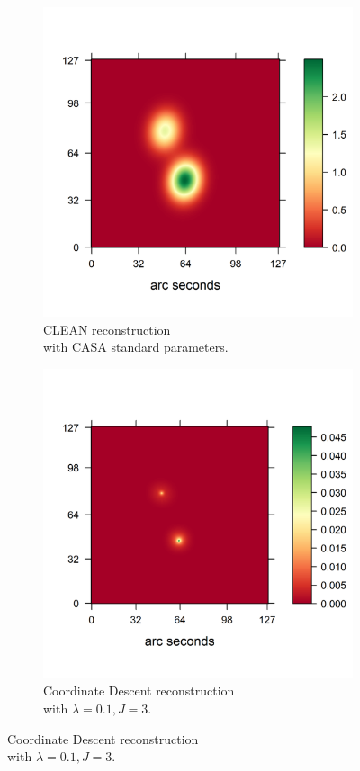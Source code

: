 \begin{figure}[h]
	\centering
	\begin{subfigure}[b]{0.4\linewidth}
		\includegraphics[width=\linewidth, trim={0.2in, 0.2in, 0, 0.2in}, clip]{./chapters/20.results/points/tclean_points.png}
		\caption{CLEAN reconstruction \\with CASA standard parameters.}
		\label{results:points:tclean}
	\end{subfigure}
	\begin{subfigure}[b]{0.4\linewidth}
		\includegraphics[width=\linewidth, trim={0.2in, 0.2in, 0, 0.2in}, clip]{./chapters/20.results/points/cd_points.png}
		\caption{Coordinate Descent reconstruction\\ with $\lambda = 0.1, J=3$.}
		\label{results:points:cd}
	\end{subfigure}
	

\end{figure}
